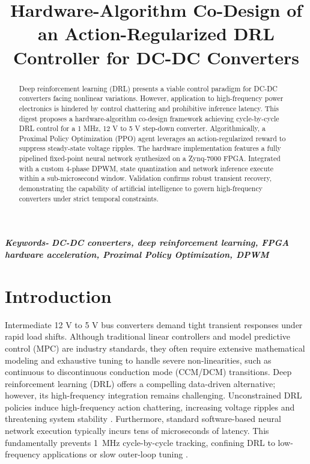 \documentclass[conference,onecolumn,letterpaper,romanappendices,12pt,english,nofonttune]{IEEEtran}
\begin{document}

\title{Hardware-Algorithm Co-Design of an Action-Regularized DRL Controller for DC-DC Converters}
\author{}
\maketitle
\vspace{-0.5in}
\thispagestyle{fancy}

\begin{abstract}
\normalsize
Deep reinforcement learning (DRL) presents a viable control paradigm for DC-DC converters facing nonlinear variations. However, application to high-frequency power electronics is hindered by control chattering and prohibitive inference latency. This digest proposes a hardware-algorithm co-design framework achieving cycle-by-cycle DRL control for a 1 MHz, 12 V to 5 V step-down converter. Algorithmically, a Proximal Policy Optimization (PPO) agent leverages an action-regularized reward to suppress steady-state voltage ripples. The hardware implementation features a fully pipelined fixed-point neural network synthesized on a Zynq-7000 FPGA. Integrated with a custom 4-phase DPWM, state quantization and network inference execute within a sub-microsecond window. Validation confirms robust transient recovery, demonstrating the capability of artificial intelligence to govern high-frequency converters under strict temporal constraints.
\end{abstract}

\vspace{0.2\baselineskip}
\noindent\textbf{\textit{Keywords-}}
\textbf{\textit{DC-DC converters, deep reinforcement learning, FPGA hardware acceleration, Proximal Policy Optimization, DPWM}}

\renewcommand{\baselinestretch}{1.5}\normalsize

\section{Introduction}

Intermediate 12 V to 5 V bus converters demand tight transient responses under rapid load shifts. Although traditional linear controllers and model predictive control (MPC) are industry standards, they often require extensive mathematical modeling and exhaustive tuning to handle severe non-linearities, such as continuous to discontinuous conduction mode (CCM/DCM) transitions. Deep reinforcement learning (DRL) \cite{gheisarnejad2020iot, ye2024deep} offers a compelling data-driven alternative; however, its high-frequency integration remains challenging. Unconstrained DRL policies induce high-frequency action chattering, increasing voltage ripples and threatening system stability \cite{11106282}. Furthermore, standard software-based neural network execution typically incurs tens of microseconds of latency. This fundamentally prevents \SI{1}{MHz} cycle-by-cycle tracking, confining DRL to low-frequency applications or slow outer-loop tuning \cite{11040024, zeng2023deep}.
\end{document}
